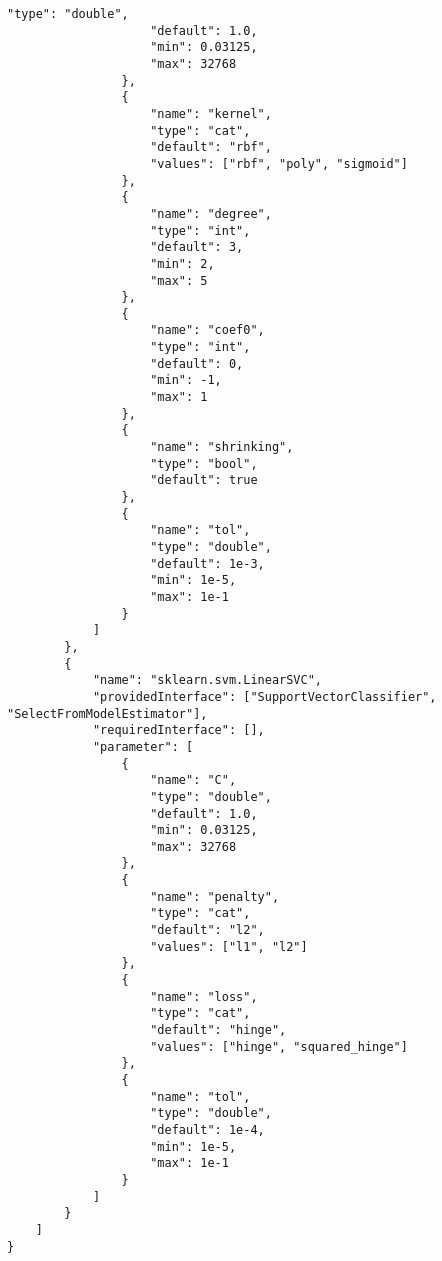 \begin{Verbatim}[fontsize=\scriptsize]
                    "type": "double",
                    "default": 1.0,
                    "min": 0.03125,
                    "max": 32768
                },
                {
                    "name": "kernel",
                    "type": "cat",
                    "default": "rbf",
                    "values": ["rbf", "poly", "sigmoid"]
                },
                {
                    "name": "degree",
                    "type": "int",
                    "default": 3,
                    "min": 2,
                    "max": 5
                },
                {
                    "name": "coef0",
                    "type": "int",
                    "default": 0,
                    "min": -1,
                    "max": 1
                },
                {
                    "name": "shrinking",
                    "type": "bool",
                    "default": true
                },
                {
                    "name": "tol",
                    "type": "double",
                    "default": 1e-3,
                    "min": 1e-5,
                    "max": 1e-1
                }
            ]
        },
        {
            "name": "sklearn.svm.LinearSVC",
            "providedInterface": ["SupportVectorClassifier", "SelectFromModelEstimator"],
            "requiredInterface": [],
            "parameter": [
                {
                    "name": "C",
                    "type": "double",
                    "default": 1.0,
                    "min": 0.03125,
                    "max": 32768
                },
                {
                    "name": "penalty",
                    "type": "cat",
                    "default": "l2",
                    "values": ["l1", "l2"]
                },
                {
                    "name": "loss",
                    "type": "cat",
                    "default": "hinge",
                    "values": ["hinge", "squared_hinge"]
                },
                {
                    "name": "tol",
                    "type": "double",
                    "default": 1e-4,
                    "min": 1e-5,
                    "max": 1e-1
                }
            ]
        }
    ]
}
\end{Verbatim}
